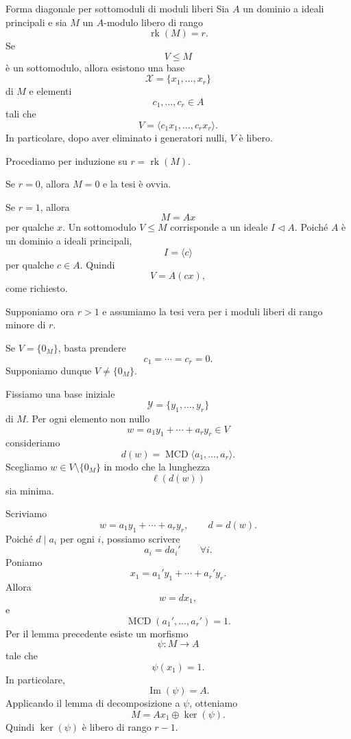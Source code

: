 \documentclass[a4paper]{article}
\begin{document}
\begin{radioactive}
\begin{snippetproposition}{Forma diagonale per sottomoduli di moduli liberi}
    Sia \(A\) un dominio a ideali principali e sia \(M\) un \(A\)-modulo libero di rango
    \[
        \operatorname{rk}(M)=r.
    \]
    Se
    \[
        V\leq M
    \]
    è un sottomodulo, allora esistono una base
    \[
        \mathcal{X}=\{x_1,\ldots,x_r\}
    \]
    di \(M\) e elementi
    \[
        c_1,\ldots,c_r\in A
    \]
    tali che
    \[
        V=\langle c_1x_1,\ldots,c_rx_r\rangle.
    \]
    In particolare, dopo aver eliminato i generatori nulli, \(V\) è libero.
\end{snippetproposition}
\end{radioactive}

\begin{radioactive}
\begin{snippetproof}{}
    Procediamo per induzione su \(r=\operatorname{rk}(M)\).

    Se \(r=0\), allora \(M=0\) e la tesi è ovvia.

    Se \(r=1\), allora
    \[
        M=Ax
    \]
    per qualche \(x\). Un sottomodulo \(V\leq M\) corrisponde a un ideale \(I\triangleleft A\). Poiché \(A\) è un dominio a ideali principali,
    \[
        I=\langle c \rangle
    \]
    per qualche \(c\in A\). Quindi
    \[
        V=A(cx),
    \]
    come richiesto.

    Supponiamo ora \(r>1\) e assumiamo la tesi vera per i moduli liberi di rango minore di \(r\).

    Se \(V=\{0_M\}\), basta prendere
    \[
        c_1=\cdots=c_r=0.
    \]
    Supponiamo dunque \(V\neq \{0_M\}\).

    Fissiamo una base iniziale
    \[
        \mathcal{Y}=\{y_1,\ldots,y_r\}
    \]
    di \(M\). Per ogni elemento non nullo
    \[
        w=a_1y_1+\cdots+a_ry_r\in V
    \]
    consideriamo
    \[
        d(w)=\operatorname{MCD}\langle a_1,\ldots,a_r \rangle.
    \]
    Scegliamo \(w\in V\setminus\{0_M\}\) in modo che la lunghezza
    \[
        \ell(d(w))
    \]
    sia minima.

    Scriviamo
    \[
        w=a_1y_1+\cdots+a_ry_r,
        \qquad
        d=d(w).
    \]
    Poiché \(d\mid a_i\) per ogni \(i\), possiamo scrivere
    \[
        a_i=da_i'
        \qquad
        \forall i.
    \]
    Poniamo
    \[
        x_1=a_1'y_1+\cdots+a_r'y_r.
    \]
    Allora
    \[
        w=dx_1,
    \]
    e
    \[
        \operatorname{MCD}(a_1',\ldots,a_r')=1.
    \]
    Per il lemma precedente esiste un morfismo
    \[
        \psi\colon M\to A
    \]
    tale che
    \[
        \psi(x_1)=1.
    \]
    In particolare,
    \[
        \operatorname{Im}(\psi)=A.
    \]
    Applicando il lemma di decomposizione a \(\psi\), otteniamo
    \[
        M=Ax_1\oplus \ker(\psi).
    \]
    Quindi \(\ker(\psi)\) è libero di rango \(r-1\).


\end{snippetproof}
\end{radioactive}
\end{document}
